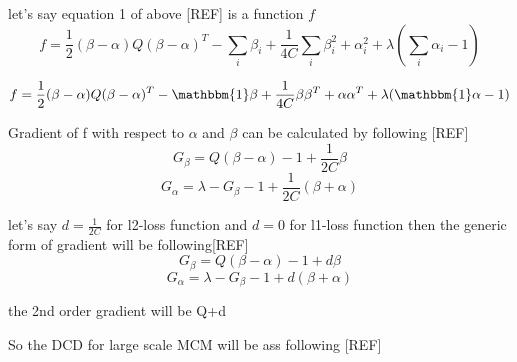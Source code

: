 let's say equation 1 of above [REF] is a function $f$
\begin{equation}\label{mcmeq1}
f = \frac{1}{2}(\beta - \alpha)Q(\beta - \alpha)^T - \sum_i{\beta_i} + \frac{1}{4C}\sum_i{\beta_i^2 + \alpha_i^2} + \lambda(\sum_i\alpha_i -1)
\end{equation}

\begin{equation}\label{mcmeq1}
f = \frac{1}{2}(\beta - \alpha)Q(\beta - \alpha)^T - \mathbbm{1}\beta + \frac{1}{4C}{\beta\beta^T + \alpha\alpha^T}  + \lambda ( \mathbbm{1}\alpha - 1)
\end{equation}

Gradient of f with respect to $\alpha$ and $\beta$ can be calculated by following [REF]
\begin{equation}
G_\beta = Q(\beta - \alpha) -1 + \frac{1}{2C}\beta
\end{equation}
\begin{equation}
G_\alpha = \lambda - G_\beta -1 + \frac{1}{2C}(\beta + \alpha)
\end{equation}

let's say $d = \frac{1}{2C}$ for l2-loss function and  $d = 0$ for l1-loss function then the generic form of gradient will be following[REF]
\begin{equation}
G_\beta = Q(\beta - \alpha) -1 + d\beta
\end{equation}
\begin{equation}
G_\alpha = \lambda - G_\beta -1 + d(\beta + \alpha)
\end{equation}

the 2nd order gradient will be Q+d

So the DCD for large scale MCM will be ass following [REF]

